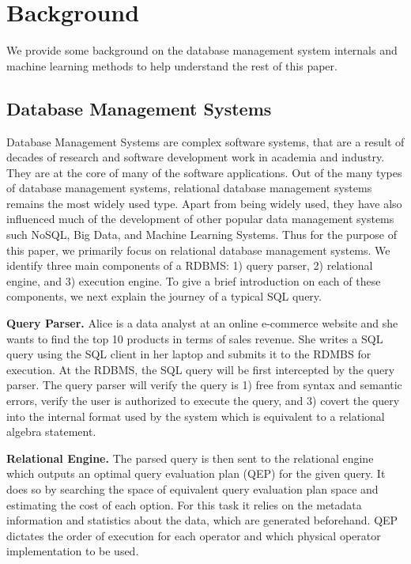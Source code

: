 \section{Background}
We provide some background on the database management system internals and machine learning methods to help understand the rest of this paper.

\subsection{Database Management Systems}
Database Management Systems are complex software systems, that are a result of decades of research and software development work in academia and industry. They are at the core of many of the software applications.
Out of the many types of database management systems, relational database management systems remains the most widely used type.
Apart from being widely used, they have also influenced much of the development of other popular data management systems such NoSQL, Big Data, and Machine Learning Systems.
Thus for the purpose of this paper, we primarily focus on relational database management systems.
We identify three main components of a RDBMS: 1) query parser, 2) relational engine, and 3) execution engine.
To give a brief introduction on each of these components, we next explain the journey of a typical SQL query.

\vspace{2mm}
\noindent \textbf{Query Parser.} Alice is a data analyst at an online e-commerce website and she wants to find the top 10 products in terms of sales revenue.
She writes a SQL query using the SQL client in her laptop and submits it to the RDMBS for execution.
At the RDBMS, the SQL query will be first intercepted by the query parser.
The query parser will verify the query is 1) free from syntax and semantic errors, verify the user is authorized to execute the query, and 3) covert the query into the internal format used by the system which is equivalent to a relational algebra statement.

\vspace{2mm}
\noindent \textbf{Relational Engine.} The parsed query is then sent to the relational engine which outputs an optimal query evaluation plan (QEP) for the given query.
It does so by searching the space of equivalent query evaluation plan space and estimating the cost of each option.
For this task it relies on the metadata information and statistics about the data, which are generated beforehand.
QEP dictates the order of execution for each operator and which physical operator implementation to be used.


